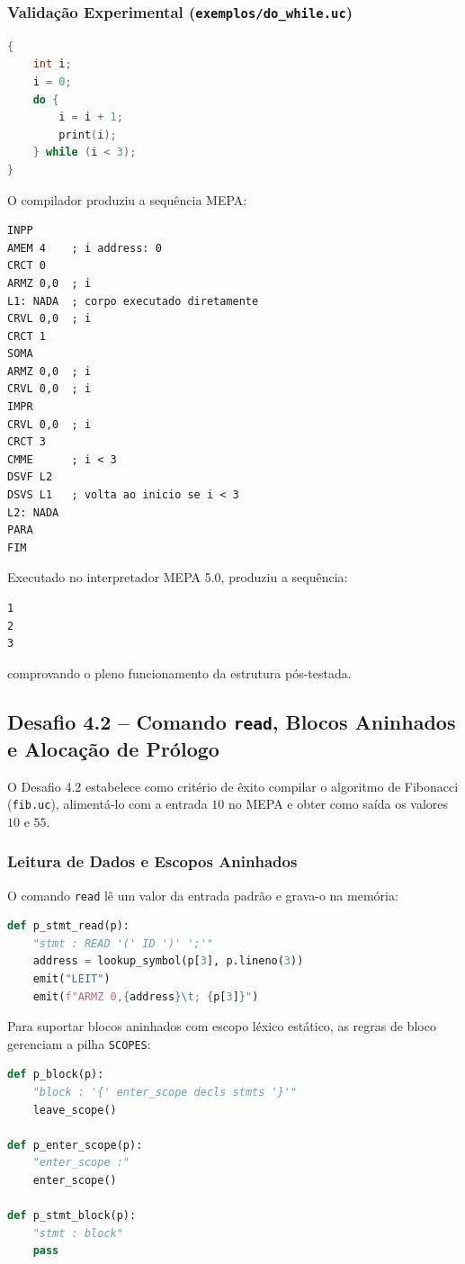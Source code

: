\documentclass[12pt,a4paper]{article}
\begin{document}
\subsubsection{Validação Experimental (\texttt{exemplos/do\_while.uc})}

\begin{lstlisting}[language=C]
{
    int i;
    i = 0;
    do {
        i = i + 1;
        print(i);
    } while (i < 3);
}
\end{lstlisting}

O compilador produziu a sequência MEPA:
\begin{lstlisting}
INPP
AMEM 4    ; i address: 0
CRCT 0
ARMZ 0,0  ; i
L1: NADA  ; corpo executado diretamente
CRVL 0,0  ; i
CRCT 1
SOMA
ARMZ 0,0  ; i
CRVL 0,0  ; i
IMPR
CRVL 0,0  ; i
CRCT 3
CMME      ; i < 3
DSVF L2
DSVS L1   ; volta ao inicio se i < 3
L2: NADA
PARA
FIM
\end{lstlisting}

Executado no interpretador MEPA 5.0, produziu a sequência:
\begin{lstlisting}
1
2
3
\end{lstlisting}
comprovando o pleno funcionamento da estrutura pós-testada.

\subsection{Desafio 4.2 -- Comando \texttt{read}, Blocos Aninhados e Alocação de Prólogo}

O Desafio 4.2 estabelece como critério de êxito compilar o algoritmo de Fibonacci
(\texttt{fib.uc}), alimentá-lo com a entrada $10$ no MEPA e obter como saída os
valores $10$ e $55$.

\subsubsection{Leitura de Dados e Escopos Aninhados}

O comando \texttt{read} lê um valor da entrada padrão e grava-o na memória:
\begin{lstlisting}[language=Python]
def p_stmt_read(p):
    "stmt : READ '(' ID ')' ';'"
    address = lookup_symbol(p[3], p.lineno(3))
    emit("LEIT")
    emit(f"ARMZ 0,{address}\t; {p[3]}")
\end{lstlisting}

Para suportar blocos aninhados com escopo léxico estático, as regras de bloco
gerenciam a pilha \texttt{SCOPES}:
\begin{lstlisting}[language=Python]
def p_block(p):
    "block : '{' enter_scope decls stmts '}'"
    leave_scope()

def p_enter_scope(p):
    "enter_scope :"
    enter_scope()

def p_stmt_block(p):
    "stmt : block"
    pass
\end{lstlisting}
\end{document}
